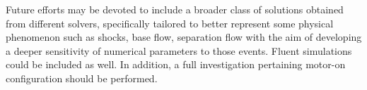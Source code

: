 \documentclass[12pt]{article}
\begin{document}
Future efforts may be devoted to include a broader class of solutions obtained from different solvers, specifically tailored to better represent some physical phenomenon such as shocks, base flow, separation flow with the aim of developing a deeper sensitivity of numerical parameters to those events. Fluent simulations could be included as well. In addition, a full investigation pertaining motor-on configuration should be performed.

\end{document}
